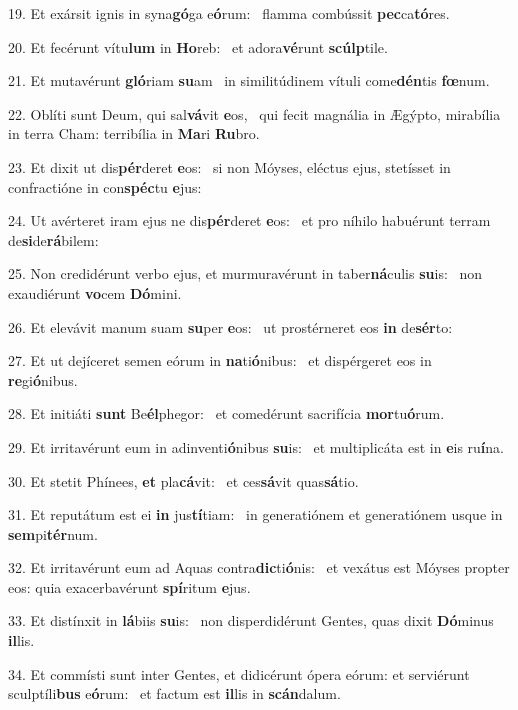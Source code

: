 19. Et exársit ignis in syna\textbf{gó}ga e\textbf{ó}rum: \ast\  flamma combússit \textbf{pec}ca\textbf{tó}res.\

20. Et fecérunt vítu\textbf{lum} in \textbf{Ho}reb: \ast\  et adora\textbf{vé}runt \textbf{scúlp}tile.\

21. Et mutavérunt \textbf{gló}riam \textbf{su}am \ast\  in similitúdinem vítuli come\textbf{dén}tis \textbf{fœ}num.\

22. Oblíti sunt Deum, qui sal\textbf{vá}vit \textbf{e}os, \ast\  qui fecit magnália in Ægýpto, mirabília in terra Cham: terribília in \textbf{Ma}ri \textbf{Ru}bro.\

23. Et dixit ut dis\textbf{pér}deret \textbf{e}os: \ast\  si non Móyses, eléctus ejus, stetísset in confractióne in con\textbf{spéc}tu \textbf{e}jus:\

24. Ut avérteret iram ejus ne dis\textbf{pér}deret \textbf{e}os: \ast\  et pro níhilo habuérunt terram de\textbf{si}de\textbf{rá}bilem:\

25. Non credidérunt verbo ejus, et murmuravérunt in taber\textbf{ná}culis \textbf{su}is: \ast\  non exaudiérunt \textbf{vo}cem \textbf{Dó}mini.\

26. Et elevávit manum suam \textbf{su}per \textbf{e}os: \ast\  ut prostérneret eos \textbf{in} de\textbf{sér}to:\

27. Et ut dejíceret semen eórum in \textbf{na}ti\textbf{ó}nibus: \ast\  et dispérgeret eos in \textbf{re}gi\textbf{ó}nibus.\

28. Et initiáti \textbf{sunt} Be\textbf{él}phegor: \ast\  et comedérunt sacrifícia \textbf{mor}tu\textbf{ó}rum.\

29. Et irritavérunt eum in adinventi\textbf{ó}nibus \textbf{su}is: \ast\  et multiplicáta est in \textbf{e}is ru\textbf{í}na.\

30. Et stetit Phínees, \textbf{et} pla\textbf{cá}vit: \ast\  et ces\textbf{sá}vit quas\textbf{sá}tio.\

31. Et reputátum est ei \textbf{in} jus\textbf{tí}tiam: \ast\  in generatiónem et generatiónem usque in \textbf{sem}pi\textbf{tér}num.\

32. Et irritavérunt eum ad Aquas contra\textbf{dic}ti\textbf{ó}nis: \ast\  et vexátus est Móyses propter eos: quia exacerbavérunt \textbf{spí}ritum \textbf{e}jus.\

33. Et distínxit in \textbf{lá}biis \textbf{su}is: \ast\  non disperdidérunt Gentes, quas dixit \textbf{Dó}minus \textbf{il}lis.\

34. Et commísti sunt inter Gentes, et didicérunt ópera eórum: et serviérunt sculptíli\textbf{bus} e\textbf{ó}rum: \ast\  et factum est \textbf{il}lis in \textbf{scán}dalum.\

